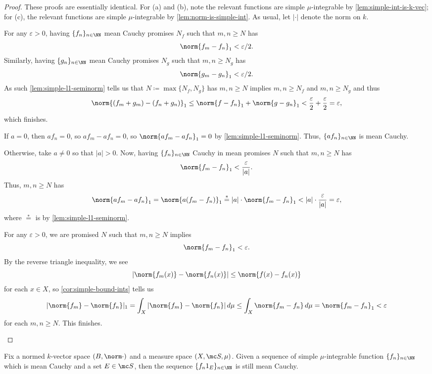 \documentclass[../notes.tex]{subfiles}
\begin{document}
\begin{proof}
	These proofs are essentially identical. For (a) and (b), note the relevant functions are simple $\mu$-integrable by \autoref{lem:simple-int-is-k-vec}; for (c), the relevant functions are simple $\mu$-integrable by \autoref{lem:norm-is-simple-int}. As usual, let $|\cdot|$ denote the norm on $k$.
	\begin{listalph}
		\item For any $\varepsilon>0$, having $\{f_n\}_{n\in\NN}$ mean Cauchy promises $N_f$ such that $m,n\ge N$ has
		\[\norm{f_m-f_n}_1<\varepsilon/2.\]
		Similarly, having $\{g_n\}_{n\in\NN}$ mean Cauchy promises $N_g$ such that $m,n\ge N_g$ has
		\[\norm{g_m-g_n}_1<\varepsilon/2.\]
		As such \autoref{lem:simple-l1-seminorm} tells us that $N\coloneqq\max\{N_f,N_g\}$ has $m,n\ge N$ implies $m,n\ge N_f$ and $m,n\ge N_g$ and thus
		\[\norm{(f_m+g_m)-(f_n+g_n)}_1\le\norm{f-f_n}_1+\norm{g-g_n}_1<\frac\varepsilon2+\frac\varepsilon2=\varepsilon,\]
		which finishes.
		\item If $a=0$, then $af_n=0$, so $af_m-af_n=0$, so $\norm{af_m-af_n}_1=0$ by \autoref{lem:simple-l1-seminorm}. Thus, $\{af_n\}_{n\in\NN}$ is mean Cauchy.

		Otherwise, take $a\ne0$ so that $|a|>0$. Now, having $\{f_n\}_{n\in\NN}$ Cauchy in mean promises $N$ such that $m,n\ge N$ has
		\[\norm{f_m-f_n}_1<\frac\varepsilon{|a|}.\]
		Thus, $m,n\ge N$ has
		\[\norm{af_m-af_n}_1=\norm{a(f_m-f_n)}_1\stackrel*=|a|\cdot\norm{f_m-f_n}_1<|a|\cdot\frac\varepsilon{|a|}=\varepsilon,\]
		where $\stackrel*=$ is by \autoref{lem:simple-l1-seminorm}.
		\item For any $\varepsilon>0$, we are promised $N$ such that $m,n\ge N$ implies
		\[\norm{f_m-f_n}_1<\varepsilon.\]
		By the reverse triangle inequality, we see
		\[|\norm{f_m(x)}-\norm{f_n(x)}|\le\norm{f(x)-f_n(x)}\]
		for each $x\in X$, so \autoref{cor:simple-bound-ints} tells us
		\[|\norm {f_m}-\norm{f_n}|_1=\int_X|\norm {f_m}-\norm{f_n}|\,d\mu\le\int_X\norm{{f_m}-f_n}\,d\mu=\norm{f_m-f_n}_1<\varepsilon\]
		for each $m,n\ge N$. This finishes.
		\qedhere
	\end{listalph}
\end{proof}
\begin{lemma} \label{lem:restrict-mean-cauchy}
	Fix a normed $k$-vector space $(B,\norm\cdot)$ and a measure space $(X,\mc S,\mu)$. Given a sequence of simple $\mu$-integrable function $\{f_n\}_{n\in\NN}$ which is mean Cauchy and a set $E\in\mc S$, then the sequence $\{f_n1_E\}_{n\in\NN}$ is still mean Cauchy.
\end{lemma}
\end{document}
